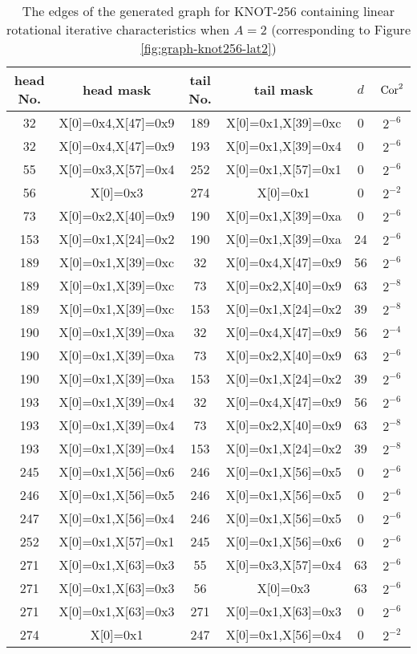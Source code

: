 \begin{table}
	\caption{The edges of the generated graph for KNOT-256 containing linear rotational iterative characteristics when $A=2$ (corresponding to Figure \ref{fig:graph-knot256-lat2})}\label{tab:dis-knot256-lat2}
	\centering
	\begin{tabular}{|c|c|c|c|c|c|}
		\hline
		head No. & head mask & tail No. & tail mask & $d$ & $\text{Cor}^2$ \\
		\hline
		32 & X[0]=0x4,X[47]=0x9 & 189 & X[0]=0x1,X[39]=0xc & 0 & $2^{-6}$ \\
        32 & X[0]=0x4,X[47]=0x9 & 193 & X[0]=0x1,X[39]=0x4 & 0 & $2^{-6}$ \\
        55 & X[0]=0x3,X[57]=0x4 & 252 & X[0]=0x1,X[57]=0x1 & 0 & $2^{-6}$ \\
        56 & X[0]=0x3 & 274 & X[0]=0x1 & 0 & $2^{-2}$ \\
        73 & X[0]=0x2,X[40]=0x9 & 190 & X[0]=0x1,X[39]=0xa & 0 & $2^{-6}$ \\
        153 & X[0]=0x1,X[24]=0x2 & 190 & X[0]=0x1,X[39]=0xa & 24 & $2^{-6}$ \\
        189 & X[0]=0x1,X[39]=0xc & 32 & X[0]=0x4,X[47]=0x9 & 56 & $2^{-6}$ \\
        189 & X[0]=0x1,X[39]=0xc & 73 & X[0]=0x2,X[40]=0x9 & 63 & $2^{-8}$ \\
        189 & X[0]=0x1,X[39]=0xc & 153 & X[0]=0x1,X[24]=0x2 & 39 & $2^{-8}$ \\
        190 & X[0]=0x1,X[39]=0xa & 32 & X[0]=0x4,X[47]=0x9 & 56 & $2^{-4}$ \\
        190 & X[0]=0x1,X[39]=0xa & 73 & X[0]=0x2,X[40]=0x9 & 63 & $2^{-6}$ \\
        190 & X[0]=0x1,X[39]=0xa & 153 & X[0]=0x1,X[24]=0x2 & 39 & $2^{-6}$ \\
        193 & X[0]=0x1,X[39]=0x4 & 32 & X[0]=0x4,X[47]=0x9 & 56 & $2^{-6}$ \\
        193 & X[0]=0x1,X[39]=0x4 & 73 & X[0]=0x2,X[40]=0x9 & 63 & $2^{-8}$ \\
        193 & X[0]=0x1,X[39]=0x4 & 153 & X[0]=0x1,X[24]=0x2 & 39 & $2^{-8}$ \\
        245 & X[0]=0x1,X[56]=0x6 & 246 & X[0]=0x1,X[56]=0x5 & 0 & $2^{-6}$ \\
        246 & X[0]=0x1,X[56]=0x5 & 246 & X[0]=0x1,X[56]=0x5 & 0 & $2^{-6}$ \\
        247 & X[0]=0x1,X[56]=0x4 & 246 & X[0]=0x1,X[56]=0x5 & 0 & $2^{-6}$ \\
        252 & X[0]=0x1,X[57]=0x1 & 245 & X[0]=0x1,X[56]=0x6 & 0 & $2^{-6}$ \\
        271 & X[0]=0x1,X[63]=0x3 & 55 & X[0]=0x3,X[57]=0x4 & 63 & $2^{-6}$ \\
        271 & X[0]=0x1,X[63]=0x3 & 56 & X[0]=0x3 & 63 & $2^{-6}$ \\
        271 & X[0]=0x1,X[63]=0x3 & 271 & X[0]=0x1,X[63]=0x3 & 0 & $2^{-6}$ \\
        274 & X[0]=0x1 & 247 & X[0]=0x1,X[56]=0x4 & 0 & $2^{-2}$ \\
		\hline
	\end{tabular}
\end{table}

